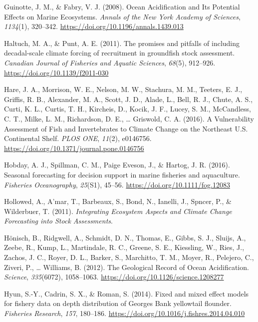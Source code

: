 \documentclass[
  12pt,
]{article}
\newlength{\cslhangindent}
\newenvironment{CSLReferences}[2] %
 {\begin{list}{}{%
  \setlength{\itemindent}{0pt}
  \setlength{\leftmargin}{0pt}
  \setlength{\parsep}{0pt}
  \ifodd #1
   \setlength{\leftmargin}{\cslhangindent}
   \setlength{\itemindent}{-1\cslhangindent}
  \fi
  \setlength{\itemsep}{#2\baselineskip}}}
 {\end{list}}
\begin{document}
\begin{CSLReferences}{1}{2}
Guinotte, J. M., \& Fabry, V. J. (2008). Ocean Acidification and Its Potential Effects on Marine Ecosystems. \emph{Annals of the New York Academy of Sciences}, \emph{1134}(1), 320--342. \url{https://doi.org/10.1196/annals.1439.013}

Haltuch, M. A., \& Punt, A. E. (2011). The promises and pitfalls of including decadal-scale climate forcing of recruitment in groundfish stock assessment. \emph{Canadian Journal of Fisheries and Aquatic Sciences}, \emph{68}(5), 912--926. \url{https://doi.org/10.1139/f2011-030}

Hare, J. A., Morrison, W. E., Nelson, M. W., Stachura, M. M., Teeters, E. J., Griffis, R. B., Alexander, M. A., Scott, J. D., Alade, L., Bell, R. J., Chute, A. S., Curti, K. L., Curtis, T. H., Kircheis, D., Kocik, J. F., Lucey, S. M., McCandless, C. T., Milke, L. M., Richardson, D. E., \ldots{} Griswold, C. A. (2016). A Vulnerability Assessment of Fish and Invertebrates to Climate Change on the Northeast U.S. Continental Shelf. \emph{PLOS ONE}, \emph{11}(2), e0146756. \url{https://doi.org/10.1371/journal.pone.0146756}

Hobday, A. J., Spillman, C. M., Paige Eveson, J., \& Hartog, J. R. (2016). Seasonal forecasting for decision support in marine fisheries and aquaculture. \emph{Fisheries Oceanography}, \emph{25}(S1), 45--56. \url{https://doi.org/10.1111/fog.12083}

Hollowed, A., A'mar, T., Barbeaux, S., Bond, N., Ianelli, J., Spncer, P., \& Wilderbuer, T. (2011). \emph{Integrating Ecosystem Aspects and Climate Change Forecasting into Stock Assessments}.

Hönisch, B., Ridgwell, A., Schmidt, D. N., Thomas, E., Gibbs, S. J., Sluijs, A., Zeebe, R., Kump, L., Martindale, R. C., Greene, S. E., Kiessling, W., Ries, J., Zachos, J. C., Royer, D. L., Barker, S., Marchitto, T. M., Moyer, R., Pelejero, C., Ziveri, P., \ldots{} Williams, B. (2012). The {Geological Record} of {Ocean Acidification}. \emph{Science}, \emph{335}(6072), 1058--1063. \url{https://doi.org/10.1126/science.1208277}

Hyun, S.-Y., Cadrin, S. X., \& Roman, S. (2014). Fixed and mixed effect models for fishery data on depth distribution of Georges Bank yellowtail flounder. \emph{Fisheries Research}, \emph{157}, 180--186. \url{https://doi.org/10.1016/j.fishres.2014.04.010}


\end{CSLReferences}
\end{document}

